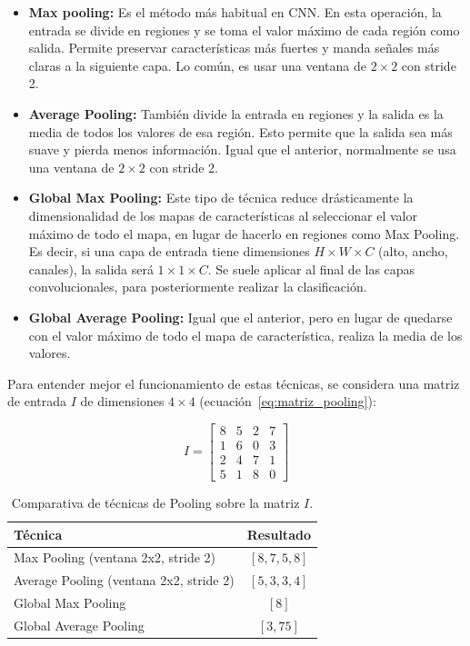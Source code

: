 \documentclass[11pt, a4paper]{article}
\numberwithin{equation}{section}
\begin{document}
\begin{itemize}
\item \textbf{Max pooling:} Es el método más habitual en CNN. En esta operación, la entrada se divide en regiones y se toma el valor máximo de cada región como salida. Permite preservar características más fuertes y manda señales más claras a la siguiente capa. Lo común, es usar una ventana de $2 \times 2$ con stride 2.

\item \textbf{Average Pooling:} También divide la entrada en regiones y la salida es la media de todos los valores de esa región. Esto permite que la salida sea más suave y pierda menos información. Igual que el anterior, normalmente se usa una ventana de $2 \times 2$ con stride 2.

\item \textbf{Global Max Pooling:} Este tipo de técnica reduce drásticamente la dimensionalidad de los mapas de características al seleccionar el valor máximo de todo el mapa, en lugar de hacerlo en regiones como Max Pooling. Es decir, si una capa de entrada tiene dimensiones $H \times W \times C$ (alto, ancho, canales), la salida será $1 \times 1 \times C$. Se suele aplicar al final de las capas convolucionales, para posteriormente realizar la clasificación.

\item \textbf{Global Average Pooling:} Igual que el anterior, pero en lugar de quedarse con el valor máximo de todo el mapa de característica, realiza la media de los valores.
\end{itemize}

Para entender mejor el funcionamiento de estas técnicas, se considera una matriz de entrada $I$ de dimensiones $4 \times 4$ (ecuación~\eqref{eq:matriz_pooling}):

\begin{equation}
\label{eq:matriz_pooling}
I = \begin{bmatrix}
8 & 5 & 2 & 7 \\
1 & 6 & 0 & 3 \\
2 & 4 & 7 & 1 \\
5 & 1 & 8 & 0
\end{bmatrix}
\end{equation}

\begin{table}[H]
\centering
\caption{Comparativa de técnicas de Pooling sobre la matriz $I$.}
\label{tab:comparativa_pooling}
\begin{tabular}{lc}
\toprule
\textbf{Técnica} & \textbf{Resultado} \\
\midrule
Max Pooling (ventana 2x2, stride 2) & $[8, 7, 5, 8]$ \\
Average Pooling (ventana 2x2, stride 2) & $[5, 3, 3, 4]$ \\
Global Max Pooling & $[8]$ \\
Global Average Pooling & $[3,75]$ \\
\bottomrule
\end{tabular}
\end{table}
\end{document}
